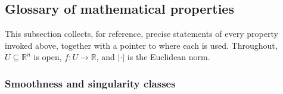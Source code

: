 \subsection{Glossary of mathematical properties}
\label{subsec:smooth_glossary}

This subsection collects, for reference, precise statements of every property invoked
above, together with a pointer to where each is used. Throughout, $U\subseteq\mathbb{R}^{n}$
is open, $f:U\to\mathbb{R}$, and $\lvert\cdot\rvert$ is the Euclidean norm.

\subsubsection{Smoothness and singularity classes}

